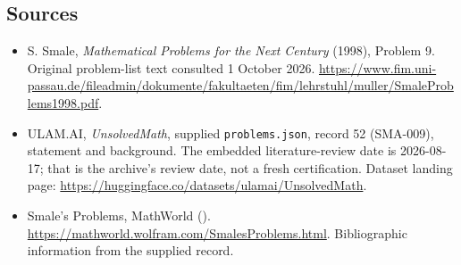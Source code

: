 \documentclass[11pt,a4paper]{article}
\begin{document}
\subsection{Sources}

{\small

\begin{itemize}
\item[E1] S. Smale, \emph{Mathematical Problems for the Next Century} (1998), Problem 9. Original problem-list text consulted 1 October 2026. \url{https://www.fim.uni-passau.de/fileadmin/dokumente/fakultaeten/fim/lehrstuhl/muller/SmaleProblems1998.pdf}.


\item[\hypertarget{source:52:1}{S1}] ULAM.AI, \emph{UnsolvedMath}, supplied \texttt{problems.json}, record 52 (SMA-009), statement and background. The embedded literature-review date is 2026-08-17; that is the archive’s review date, not a fresh certification. Dataset landing page: \url{https://huggingface.co/datasets/ulamai/UnsolvedMath}.

\item[\hypertarget{source:52:2}{S2}] Smale's Problems, MathWorld (). \url{https://mathworld.wolfram.com/SmalesProblems.html}. Bibliographic information from the supplied record.

\end{itemize}

}

\label{end:52}
\end{document}
